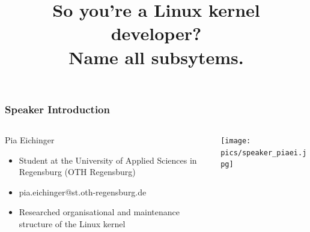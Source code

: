 \documentclass{beamer}
\title{So you're a Linux kernel developer? \\Name all subsytems.}
\begin{document}




	\begin{frame}
	\frametitle{Speaker Introduction}
	\begin{columns}
		\begin{column}{0.65\textwidth}
			\begin{block}{Pia Eichinger}
			\begin{itemize}
				\item Student at the University of Applied Sciences in Regensburg (OTH Regensburg)
			\item pia.eichinger@st.oth-regensburg.de
			\item Researched organisational and maintenance structure of the Linux kernel
			\end{itemize}
			\end{block}
		\end{column}
		\begin{column}{0.3\textwidth}
     		\texttt{[image: pics/speaker\_piaei.jpg]}
		\end{column}
	\end{columns}
	\end{frame}
\end{document}

